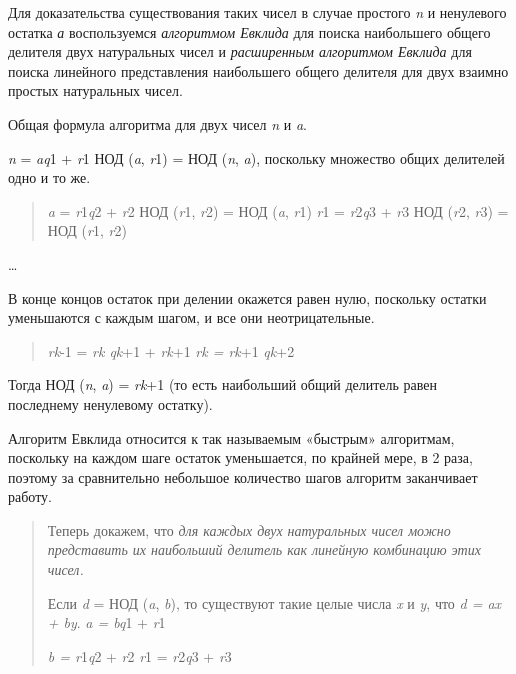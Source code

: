 \documentclass[12pt]{article}
\begin{document}
    Для доказательства существования таких чисел в случае простого \emph{n}
    и ненулевого остатка \emph{а} воспользуемся \emph{алгоритмом Евклида}
    для поиска наибольшего общего делителя двух натуральных чисел и
    \emph{расширенным алгоритмом Евклида} для поиска линейного представления
    наибольшего общего делителя для двух взаимно простых натуральных чисел.

    Общая формула алгоритма для двух чисел \emph{n} и \emph{a}.

    \emph{n} = \emph{aq}1 + \emph{r}1 НОД (\emph{a}, \emph{r}1) = НОД
    (\emph{n}, \emph{a}), поскольку множество общих делителей одно и то же.

    \begin{quote}
        \emph{a} = \emph{r}1\emph{q}2 + \emph{r}2 НОД (\emph{r}1, \emph{r}2) =
        НОД (\emph{a}, \emph{r}1) \emph{r}1 = \emph{r}2\emph{q}3 + \emph{r}3 НОД
        (\emph{r}2, \emph{r}3) = НОД (\emph{r}1, \emph{r}2)
    \end{quote}

    \ldots{}

    В конце концов остаток при делении окажется равен нулю, поскольку
    остатки уменьшаются с каждым шагом, и все они неотрицательные.

    \begin{quote}
        \emph{rk}-1 = \emph{rk qk}+1 + \emph{rk}+1 \emph{rk = rk}+1 \emph{qk}+2
    \end{quote}

    Тогда НОД (\emph{n}, \emph{a}) = \emph{rk}+1 (то есть наибольший общий
    делитель равен последнему ненулевому остатку).

    Алгоритм Евклида относится к так называемым «быстрым» алгоритмам,
    поскольку на каждом шаге остаток уменьшается, по крайней мере, в 2 раза,
    поэтому за сравнительно небольшое количество шагов алгоритм заканчивает
    работу.

    \begin{quote}
        Теперь докажем, что \emph{для каждых двух натуральных чисел можно
            представить их наибольший делитель как линейную комбинацию этих чисел.}

        Если \emph{d} = НОД (\emph{a}, \emph{b}), то существуют такие целые
        числа \emph{x} и \emph{y}, что \emph{d = ax + by}. \emph{a = bq}1 +
        \emph{r}1

        \emph{b = r}1\emph{q}2 + \emph{r}2 \emph{r}1 = \emph{r}2\emph{q}3 +
        \emph{r}3
    \end{quote}
\end{document}
